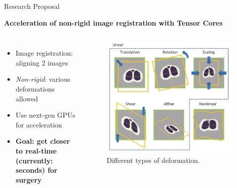 \begin{frame}{Research Proposal}
	\begin{center}
		\textbf{Acceleration of non-rigid image registration with Tensor Cores}
	\end{center}
	\begin{columns}
		\begin{itemize}
			\item Image registration: aligning 2 images
			\item \emph{Non-rigid}: various deformations allowed
			\item Use next-gen GPUs for acceleration
			\item \textbf{Goal: get closer to real-time (currently: seconds) for surgery} 
		\end{itemize}

		\begin{figure}
			\includegraphics[width=\textwidth]{registration}
			\caption[Deformations]{Different types of deformation.}
			\label{fig:registration}	
		\end{figure}

	\end{columns}
	
\end{frame}